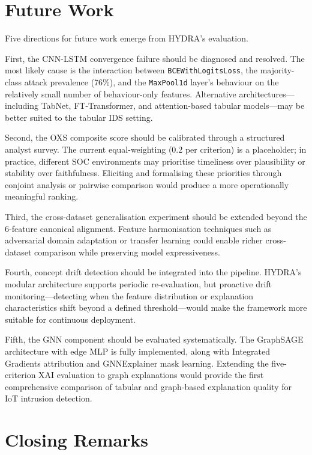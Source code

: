 \documentclass[12pt,a4paper]{report}
\begin{document}
\section{Future Work}
\label{sec:future}

Five directions for future work emerge from HYDRA's evaluation.

First, the CNN-LSTM convergence failure should be diagnosed and resolved. The most likely cause is the interaction between \texttt{BCEWithLogitsLoss}, the majority-class attack prevalence (76\%), and the \texttt{MaxPool1d} layer's behaviour on the relatively small number of behaviour-only features. Alternative architectures---including TabNet, FT-Transformer, and attention-based tabular models---may be better suited to the tabular IDS setting.

Second, the OXS composite score should be calibrated through a structured analyst survey. The current equal-weighting (0.2 per criterion) is a placeholder; in practice, different SOC environments may prioritise timeliness over plausibility or stability over faithfulness. Eliciting and formalising these priorities through conjoint analysis or pairwise comparison would produce a more operationally meaningful ranking.

Third, the cross-dataset generalisation experiment should be extended beyond the 6-feature canonical alignment. Feature harmonisation techniques such as adversarial domain adaptation or transfer learning could enable richer cross-dataset comparison while preserving model expressiveness.

Fourth, concept drift detection should be integrated into the pipeline. HYDRA's modular architecture supports periodic re-evaluation, but proactive drift monitoring---detecting when the feature distribution or explanation characteristics shift beyond a defined threshold---would make the framework more suitable for continuous deployment.

Fifth, the GNN component should be evaluated systematically. The GraphSAGE architecture with edge MLP is fully implemented, along with Integrated Gradients attribution and GNNExplainer mask learning. Extending the five-criterion XAI evaluation to graph explanations would provide the first comprehensive comparison of tabular and graph-based explanation quality for IoT intrusion detection.

\section{Closing Remarks}
\label{sec:closing}
\end{document}
